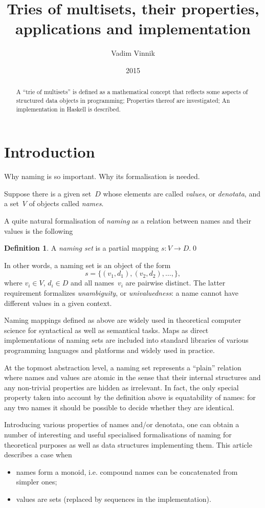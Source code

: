 \documentclass{article}
\title{Tries of multisets, their properties, applications and implementation}
\author{Vadim Vinnik}
\date{2015}
\theoremstyle{definition}
\newtheorem{Df}{Definition}
\begin{document}
\maketitle

\begin{abstract}
A ``trie of multisets'' is defined as a mathematical concept that
reflects some aspects of structured data objects in programming;
Properties thereof are investigated; An implementation in Haskell
is described.
\end{abstract}

\tableofcontents

\section{Introduction}

Why naming is so important. Why its formalisation is needed.

Suppose there is a given set~$D$ whose elements are called \emph{values}, or
\emph{denotata}, and a set~$V$ of objects called \emph{names}.

A quite natural formalisation of \emph{naming} as a relation between names and
their values is the following
\begin{Df}\label{def:naming-set}
A \emph{naming set} is a partial mapping $s: V\to D$.\qed
\end{Df}

In other words, a naming set is an object of the form
\[
  s = \{ (v_1, d_1), (v_2, d_2), \ldots, \} ,
\]
where $v_i\in V$, $d_i\in D$ and all names~$v_i$ are pairwise distinct. The
latter requirement formalizes \emph{unambiguity}, or \emph{univaluedness}: a
name cannot have different values in a given context.

Naming mappings defined as above are widely used in theoretical computer
science for syntactical as well as semantical tasks. Maps as direct
implementations of naming sets are included into standard libraries of various
programming languages and platforms and widely used in practice.

At the topmost abstraction level, a naming set represents a ``plain''
relation where names and values are atomic in the sense that their internal
structures and any non-trivial properties are hidden as irrelevant. In
fact, the only special property taken into account by the definition above is
equatability of names: for any two names it should be possible to decide
whether they are identical.

Introducing various properties of names and/or denotata, one can obtain a
number of interesting and useful specialised formalisations of naming for
theoretical purposes as well as data structures implementing them.
This article describes a case when
\begin{itemize}
\item names form a monoid, i.e. compound names can be concatenated from
simpler ones;
\item values are sets (replaced by sequences in the implementation).
\end{itemize}
\end{document}
